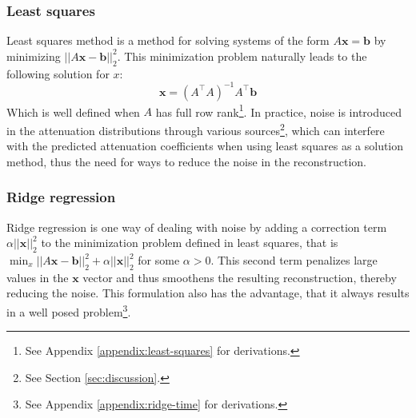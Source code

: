 \documentclass{article}
\begin{document}
\subsubsection{Least squares}\label{sec:least-squares-text} 
Least squares method is a method for solving systems of the form $A\mathbf{x} = \mathbf{b}$ by minimizing $||A\mathbf{x} - \mathbf{b}||_{2}^{2}$. This minimization problem naturally leads to the following solution for $x$:
\begin{equation}
    \mathbf{x} = (A^\intercal A)^{-1} A^\intercal \mathbf{b}
\end{equation}
Which is well defined when $A$ has full row rank\footnote{See Appendix \ref{appendix:least-squares} for derivations.}. In practice, noise is introduced in the attenuation distributions through various sources\footnote{See Section \ref{sec:discussion}.}, which can interfere with the predicted attenuation coefficients when using least squares as a solution method, thus the need for ways to reduce the noise in the reconstruction.

\subsubsection{Ridge regression}\label{sec:ridgre-regression-text}
Ridge regression is one way of dealing with noise by adding a correction term $\alpha ||\mathbf{x}||_2^2$ to the minimization problem defined in least squares, that is $\min_x ||A\mathbf{x} - \mathbf{b}||_2^2 + \alpha ||\mathbf{x}||_2^2$ for some $\alpha > 0$. This second term penalizes large values in the $\mathbf{x}$ vector and thus smoothens the resulting reconstruction, thereby reducing the noise. This formulation also has the advantage, that it always results in a well posed problem\footnote{See Appendix \ref{appendix:ridge-time} for derivations.}.

\end{document}
